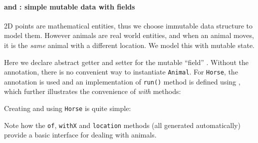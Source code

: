 %
%

\paragraph{\Q@Animal@ and \Q@Horse@: simple mutable data with fields}
2D points are mathematical entities, thus we choose immutable data structure to
model them. However animals are real world entities, and when an animal moves,
it is the \emph{same} animal with a different location. We model this with
mutable state.


\noindent Here we declare abstract getter and setter for the mutable ``field''
\Q@location@.  Without the \mixin annotation, there is no convenient way to
instantiate \texttt{Animal}.  For \texttt{Horse}, the \mixin annotation is used
and an implementation of \texttt{run()} method is defined using \Q@default@,
which further illustrates the convenience of \emph{with} methods:


\noindent Creating and using \texttt{Horse} is quite simple:


\noindent Note how the \texttt{of}, \texttt{withX} and
\texttt{location} methods (all generated automatically) provide a
basic interface for dealing with animals.

